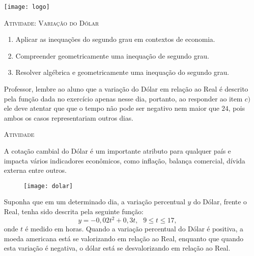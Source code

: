 \documentclass[10 pt,usenames,dvipsnames, oneside]{article}
\begin{document}
\begin{center}
  \begin{minipage}[l]{3cm}
\texttt{[image: logo]}    
\end{minipage}\hfill
\begin{minipage}[r]{.8\textwidth}
 {\Large \scshape Atividade: Variação do Dólar}  
\end{minipage}
\end{center}
\vspace{.2cm}

\ifdefined\prof

\begin{goals}
\begin{enumerate}
\item Aplicar as inequações do segundo grau em contextos de economia.
\item Compreender geometricamente uma inequação de segundo grau.
\item Resolver algébrica e geometricamente uma inequação do segundo grau.
\end{enumerate}

\tcblower

Professor, lembre ao aluno que a variação do Dólar em relação ao Real é descrito pela função dada no exercício apenas nesse dia, portanto, ao responder ao item $c)$ ele deve atentar que que o tempo não pode ser negativo nem maior que $24$, pois ambos os casos representariam outros dias.
\end{goals}

\bigskip
\begin{center}
{\large \scshape Atividade}
\end{center}
\fi

A cotação cambial do Dólar é um importante atributo para qualquer país e impacta vários indicadores econômicos, como inflação, balança comercial, dívida externa entre outros. 

\begin{figure}[H]
\centering
\noindent\texttt{[image: dolar]}
\end{figure}

Suponha que em um determinado dia, a variação percentual $y$ do Dólar, frente o Real, tenha sido descrita pela seguinte função:
$$
y = -0,02t^2 + 0,3t, \ \ \ 9 \leq t \leq 17, 
$$
onde $t$ é medido em horas. Quando a variação percentual do Dólar é positiva, a moeda americana está se valorizando em relação ao Real, enquanto que quando esta variação é negativa, o dólar está se desvalorizando em relação ao Real.
\end{document}
